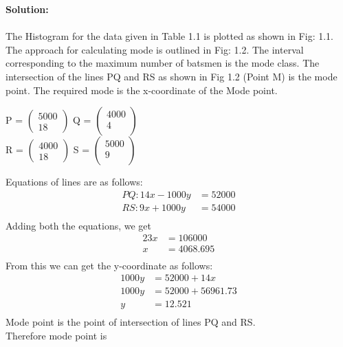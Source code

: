 \documentclass[12pt, a4paper] {article}
\begin{document}
\textbf{Solution: }\\\\
The Histogram for the data given in Table 1.1 is plotted as shown in Fig: 1.1. \\
The approach for calculating mode is outlined in Fig: 1.2. The interval corresponding to the maximum number of batsmen is the mode class. The intersection of the lines PQ and RS as shown in Fig 1.2 (Point M) is the mode point. The required mode is the x-coordinate of the Mode point.\\
\begin{center}
P =
$\begin{pmatrix}
  5000\\
  18
\end{pmatrix}$ 
Q =
$\begin{pmatrix}
  4000\\
  4\\
\end{pmatrix}$ 
\\
R =
$\begin{pmatrix}
  4000\\
  18
\end{pmatrix}$ 
S =
$\begin{pmatrix}
  5000\\
  9\\
\end{pmatrix}$ \\
\end{center}
Equations of lines are as follows:\\
\begin{align*} 
PQ : 14x - 1000y &=  52000 \\ RS : 9x + 1000y &=  54000 \\
\end{align*}
Adding both the equations, we get
\begin{align*}
23x &= 106000 \\
x &= 4068.695 \\
\end{align*}
From this we can get the y-coordinate as follows:
\begin{align*}
1000y &=  52000 + 14x \\
1000y &=  52000 + 56961.73 \\
y &= 12.521 \\
\end{align*}
Mode point is the point of intersection of lines PQ and RS.\\
Therefore mode point is\\
\end{document}
